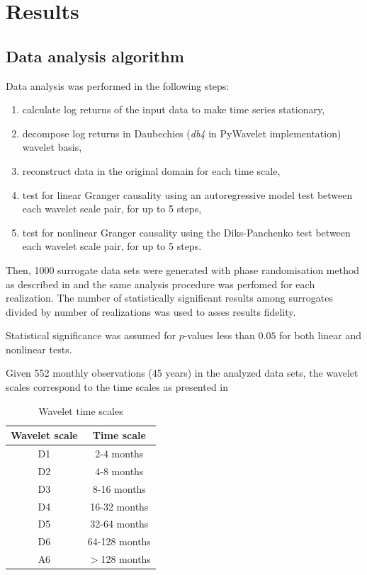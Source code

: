 \section{Results} \label{sec:results}

\subsection{Data analysis algorithm}

Data analysis was performed in the following steps:
\begin{enumerate}
\item calculate log returns of the input data to make time series stationary,
\item decompose log returns in Daubechies (\emph{db4} in PyWavelet implementation) wavelet basis,
\item reconstruct data in the original domain for each time scale,
\item test for linear Granger causality using an autoregressive model test between each wavelet scale pair, for up to 5 steps,
\item test for nonlinear Granger causality using the Diks-Panchenko test between each wavelet scale pair, for up to 5 steps.
\end{enumerate}

Then, 1000 surrogate data sets were generated with phase randomisation method as described in  and the same analysis procedure was perfomed for each realization.
The number of statistically significant results among surrogates divided by number of realizations was used to asses results fidelity.

Statistical significance was assumed for $p$-values less than $0.05$ for both linear and nonlinear tests.

Given 552 monthly observations (45 years) in the analyzed data sets, the wavelet scales correspond to the time scales as presented in  

\begin{table}[h]
\begin{center}
\begin{tabular}{c|c}
\hline\hline
Wavelet scale & Time scale \\
\hline
D1 & 2-4 months \\
D2 & 4-8 months \\
D3 & 8-16 months \\
D4 & 16-32 months \\
D5 & 32-64 months \\
D6 & 64-128 months \\
A6 & $>$128 months \\
\hline\hline
\end{tabular}
\end{center}
\caption{Wavelet time scales}
\label{tab:scales}
\end{table}

